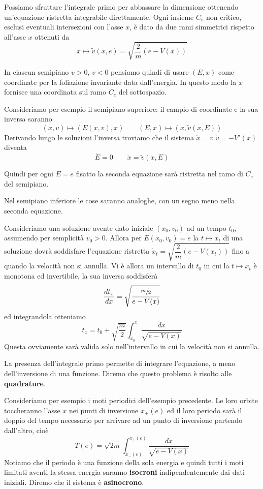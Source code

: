 \documentclass[11pt,a4paper,twoside]{book}
\newenvironment{esempio}[1][Esempio]{ 
  \begin{center}\begin{tcolorbox}[
  title={#1:\\},
  width=0.9\linewidth,
  flush right,
  enhanced jigsaw, 
  colback=white, 
  frame hidden, 
  sharpish corners, arc=3mm,
  borderline west = {1pt}{0pt}{gray},
  borderline south = {1pt}{0pt}{gray},
  coltitle=black, 
  fonttitle=\small\bfseries, 
  attach title to upper, 
  breakable,
  top=2.5pt, bottom=0.3pt]\small
  }{
 \normalsize \end{tcolorbox}\end{center}
}
\theoremstyle{esss}
\theoremstyle{dotless}
\numberwithin{equation}{section} %
\begin{document}
Possiamo sfruttare l'integrale primo per abbassare la dimensione ottenendo un'equazione ristretta integrabile direttamente.
Ogni insieme $C_e$ non critico, esclusi eventuali intersezioni con l'asse $x$, è dato da due rami simmetrici rispetto all'asse $x$ ottenuti da 
\[
x\mapsto\tilde{v}(x,e)=\sqrt{\dfrac{2}{m}\left(e-V(x)\right)}
\]

In ciascun semipiano $v>0$, $v<0$ pensiamo quindi di usare $(E,x)$ come coordinate per la foliazione invariante data dall'energia. In questo modo la $x$ fornisce una coordinata sul ramo $C_e$ del sottospazio.

Consideriamo per esempio il semipiano superiore: il campio di coordinate e la sua inversa saranno
\[
(x,v)\mapsto\left(E(x,v),x\right) \qquad (E,x)\mapsto(x,\tilde{v}(x,E))
\]
Derivando lungo le soluzioni l'inversa troviamo che il sistema $\dot{x}=v$ $\dot{v}=-V'(x)$ diventa
\begin{equation}
\dot{E}=0 \qquad \dot{x}=\tilde{v}(x,E)
\end{equation}

Quindi per ogni $E=e$ fisatto la seconda equazione sarà ristretta nel ramo di $C_e$ del semipiano. 

Nel semipiano inferiore le cose saranno analoghe, con un segno meno nella seconda equazione.

Consideriamo una soluzione avente dato iniziale $(x_0,v_0)$ ad un tempo $t_0$, assumendo per semplicità $v_0>0$.
Allora per $E(x_0,v_0)=e$ la $t\mapsto x_t$ di una soluzione dovrà soddisfare l'equazione ristretta $\dot{x}_t=\sqrt{\dfrac{2}{m}\left(e-V(x_t)\right)}$ fino a quando la velocità non si annulla. Vi è allora un intervallo di $t_0$ in cui la $t\mapsto x_t$ è monotona ed invertibile, la sua inversa soddisferà
\[
\dfrac{dt_x}{dx}=\sqrt{\dfrac{\sfrac{m}{2}}{e-V(x)}}
\]
ed integrandola otteniamo
\begin{equation}
t_x=t_0+\sqrt{\dfrac{m}{2}}\int_{x_0}^{x}\dfrac{dx}{\sqrt{e-V(x)}}
\end{equation}
Questa ovviamente sarà valida solo nell'intervallo in cui la velocità non si annulla. 

La presenza dell'integrale primo permette di integrare l'equazione, a meno dell'inversione di una funzione. Diremo che questo problema è risolto alle \textbf{quadrature}.

\begin{esempio}[Periodo dei moti limitati]
Consideriamo per esempio i moti periodici dell'esempio precedente. Le loro orbite toccheranno l'asse $x$ nei punti di inversione $x_\pm(e)$ ed il loro periodo sarà il doppio del tempo necessario per arrivare ad un punto di inversione partendo dall'altro, cioè
\[
T(e)=\sqrt{2m}\int_{x_-(e)}^{x_+(e)} \dfrac{dx}{\sqrt{e-V(x)}}
\]
Notiamo che il periodo è una funzione della sola energia e quindi tutti i moti limitati aventi la stessa energia saranno \textbf{isocroni} indipendentemente dai dati iniziali. Diremo che il sistema è \textbf{asinocrono}.
\end{esempio}
\end{document}
